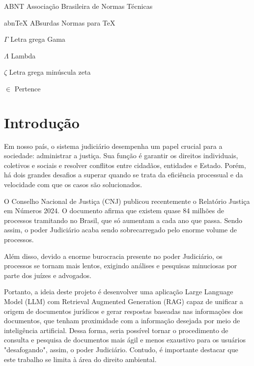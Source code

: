 \documentclass[
	12pt,				%
	openright,			%
	oneside,			    %
	a4paper,				%
	english,			%
	french,			%
	spanish,			%
	brazil			%
	]{abntex2}
\begin{document}
\begin{siglas}
  \item[ABNT] Associação Brasileira de Normas Técnicas
  \item[abnTeX] ABsurdas Normas para TeX
\end{siglas}

\begin{simbolos}
  \item[$ \Gamma $] Letra grega Gama
  \item[$ \Lambda $] Lambda
  \item[$ \zeta $] Letra grega minúscula zeta
  \item[$ \in $] Pertence
\end{simbolos}

\tableofcontents*
\cleardoublepage



\textual


\chapter{Introdução}
Em nosso país, o sistema judiciário desempenha um papel crucial para a sociedade: administrar a justiça. Sua função é garantir os direitos individuais, coletivos e sociais e resolver conflitos entre cidadãos, entidades e Estado. Porém, há dois grandes desafios a superar quando se trata da eficiência processual e da velocidade com que os casos são solucionados.

O Conselho Nacional de Justiça (CNJ) publicou recentemente o Relatório Justiça em Números 2024. O documento afirma que existem quase  84 milhões de processos tramitando no Brasil, que só aumentam a cada ano que passa. Sendo assim, o poder Judiciário acaba sendo sobrecarregado pelo enorme volume de processos.

Além disso, devido a enorme burocracia presente no poder Judiciário, os processos se tornam mais lentos, exigindo análises e pesquisas minuciosas por parte dos juízes e advogados.

Portanto, a ideia deste projeto é desenvolver uma aplicação  Large Language Model (LLM) com Retrieval Augmented Generation (RAG) capaz de unificar a origem de documentos jurídicos e gerar respostas baseadas nas informações dos documentos, que tenham proximidade com a informação desejada por meio de inteligência artificial. Dessa forma, seria possível tornar o procedimento de consulta e pesquisa de documentos mais ágil e menos exaustivo para os usuários "desafogando", assim, o poder Judiciário. Contudo, é importante destacar que este trabalho se limita à área do direito ambiental.
\end{document}
